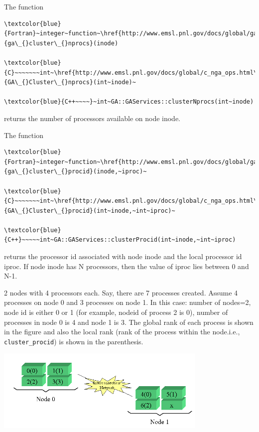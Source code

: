 The function
\begin{verbatim}
\textcolor{blue}{Fortran}~integer~function~\href{http://www.emsl.pnl.gov/docs/global/ga_ops.html\#ga_cluster_nprocs}{ga\_{}cluster\_{}nprocs}(inode)

\textcolor{blue}{C}~~~~~~~int~\href{http://www.emsl.pnl.gov/docs/global/c_nga_ops.html\#ga_cluster_nprocs}{GA\_{}Cluster\_{}nprocs}(int~inode)~

\textcolor{blue}{C++~~~~}~int~GA::GAServices::clusterNprocs(int~inode)
\end{verbatim}
returns the number of processors available on node inode.

The function
\begin{verbatim}
\textcolor{blue}{Fortran}~integer~function~\href{http://www.emsl.pnl.gov/docs/global/ga_ops.html\#ga_cluster_procid}{ga\_{}cluster\_{}procid}(inode,~iproc)~

\textcolor{blue}{C}~~~~~~~int~\href{http://www.emsl.pnl.gov/docs/global/c_nga_ops.html\#ga_cluster_procid}{GA\_{}Cluster\_{}procid}(int~inode,~int~iproc)~

\textcolor{blue}{C++}~~~~~int~GA::GAServices::clusterProcid(int~inode,~int~iproc)
\end{verbatim}
returns the processor id associated with node inode and the local
processor id iproc. If node inode has N processors, then the value
of iproc lies between 0 and N-1.

\textit{} 2 nodes with 4 processors each. Say,
there are 7 processes created. Assume 4 processes on node 0 and 3
processes on node 1. In this case: number of nodes=2, node id is either
0 or 1 (for example, nodeid of process 2 is 0), number of processes
in node 0 is 4 and node 1 is 3. The global rank of each process is
shown in the figure and also the local rank (rank of the process within
the node.i.e., \texttt{cluster\_procid}) is shown in the parenthesis.

\begin{flushleft}
\includegraphics[width=4in]{cluster}
\par\end{flushleft}


